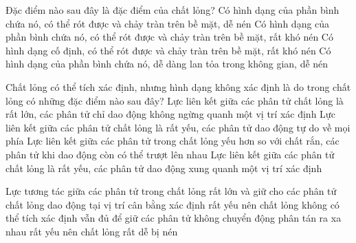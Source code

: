 \begin{ex}%
	Đặc điểm nào sau đây là đặc điểm của chất lỏng?
	\choice
	{Có hình dạng của phần bình chứa nó, có thể rót được và chảy tràn trên bề mặt, dễ nén}
	{\True Có hình dạng của phần bình chứa nó, có thể rót được và chảy tràn trên bề mặt, rất khó nén}
	{Có hình dạng cố định, có thể rót được và chảy tràn trên bề mặt, rất khó nén}
	{Có hình dạng của phần bình chứa nó, dễ dàng lan tỏa trong không gian, dễ nén}
	\end{ex}

\begin{ex}%
	Chất lỏng có thể tích xác định, nhưng hình dạng không xác định là do trong chất lỏng có những đặc điểm nào sau đây?
	\choice
	{Lực liên kết giữa các phân tử chất lỏng là rất lớn, các phân tử chỉ dao động không ngừng quanh một vị trí xác định}
	{Lực liên kết giữa các phân tử chất lỏng là rất yếu, các phân tử dao động tự do về mọi phía}
	{\True Lực liên kết giữa các phân tử trong chất lỏng yếu hơn so với chất rắn, các phân tử khi dao động còn có thể trượt lên nhau}
	{Lực liên kết giữa các phân tử chất lỏng là rất yếu, các phân tử dao động xung quanh một vị trí xác định}
	\end{ex}





\begin{ex}%
	Lực tương tác giữa các phân tử trong chất lỏng
	\choice
	{rất lớn và giữ cho các phân tử chất lỏng dao động tại vị trí cân bằng xác định}
	{rất yếu nên chất lỏng không có thể tích xác định}
	{\True vẫn đủ để giữ các phân tử không chuyển động phân tán ra xa nhau}
	{rất yếu nên chất lỏng rất dễ bị nén}
\end{ex}

